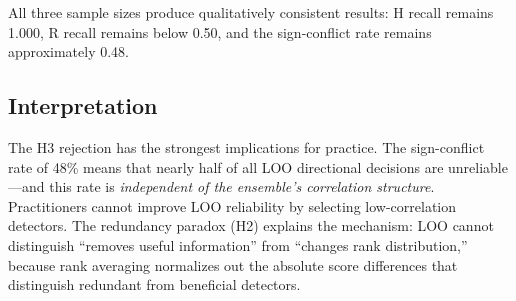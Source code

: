All three sample sizes produce qualitatively consistent results: H recall remains 1.000, R recall remains below 0.50, and the sign-conflict rate remains approximately 0.48.

\subsection{Interpretation}

The H3 rejection has the strongest implications for practice. The sign-conflict rate of 48\% means that nearly half of all LOO directional decisions are unreliable---and this rate is \emph{independent of the ensemble's correlation structure}. Practitioners cannot improve LOO reliability by selecting low-correlation detectors. The redundancy paradox (H2) explains the mechanism: LOO cannot distinguish ``removes useful information'' from ``changes rank distribution,'' because rank averaging normalizes out the absolute score differences that distinguish redundant from beneficial detectors.
